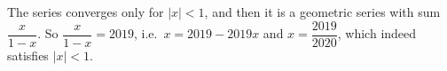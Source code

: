 The series converges only for $|x|<1$, and then it is a geometric series with sum $\dfrac{x}{1-x}$. So $\dfrac{x}{1-x}=2019$, i.e.\ $x=2019-2019x$ and $x=\boxed{\dfrac{2019}{2020}}$, which indeed satisfies $|x|<1$.

